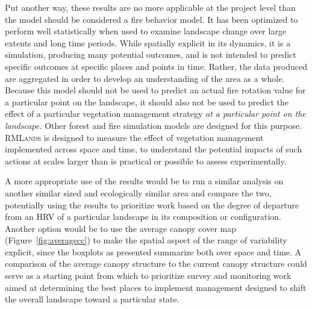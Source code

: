 Put another way, these results are no more applicable at the project level than the model should be considered a fire behavior model. It has been optimized to perform well statistically when used to examine landscape change over large extents and long time periods. While spatially explicit in its dynamics, it is a simulation, producing many potential outcomes, and is not intended to predict specific outcomes at specific places and points in time. Rather, the data produced are aggregated in order to develop an understanding of the area as a whole. Because this model should not be used to predict an actual fire rotation value for a particular point on the landscape, it should also not be used to predict the effect of a particular vegetation management strategy \emph{at a particular point on the landscape.} Other forest and fire simulation models are designed for this purpose. \textsc{RMLands} is designed to measure the effect of vegetation management implemented across space and time, to understand the potential impacts of such actions at scales larger than is practical or possible to assess experimentally. 

A more appropriate use of the results would be to run a similar analysis on another similar sized and ecologically similar area and compare the two, potentially using the results to prioritize work based on the degree of departure from an HRV of a particular landscape in its composition or configuration. Another option would be to use the average canopy cover map (Figure~\ref{fig:averagecc}) to make the spatial aspect of the range of variability explicit, since the boxplots as presented summarize both over space and time. A comparison of the average canopy structure to the current canopy structure could serve as a starting point from which to prioritize survey and monitoring work aimed at determining the best places to implement management designed to shift the overall landscape toward a particular state.

